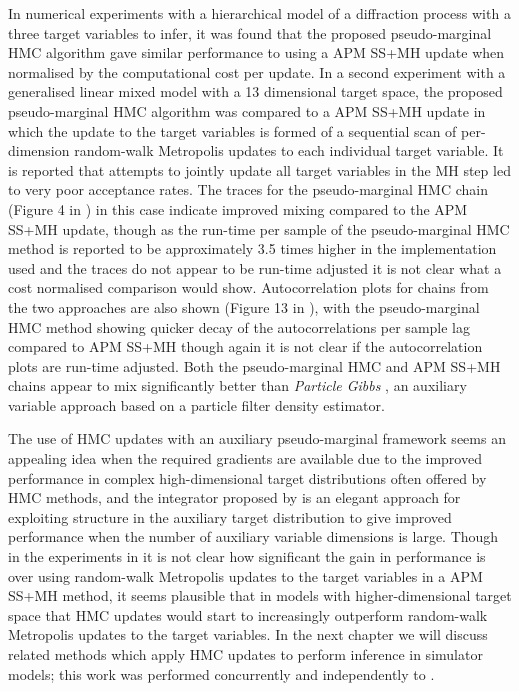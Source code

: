 In numerical experiments with a hierarchical model of a diffraction process with a three target variables to infer, it was found that the proposed pseudo-marginal \ac{HMC} algorithm gave similar performance to using a \ac{APM} \ac{SS}+\ac{MH} update when normalised by the computational cost per update. In a second experiment with a generalised linear mixed model with a 13 dimensional target space, the proposed pseudo-marginal \ac{HMC} algorithm was compared to a \ac{APM} \ac{SS}+\ac{MH} update in which the update to the target variables is formed of a sequential scan of per-dimension random-walk Metropolis updates to each individual target variable. It is reported that attempts to jointly update all target variables in the \ac{MH} step led to very poor acceptance rates. The traces for the pseudo-marginal \ac{HMC} chain (Figure 4 in \citep{lindsten2016pseudo}) in this case indicate improved mixing compared to the \ac{APM} \ac{SS}+\ac{MH} update, though as the run-time per sample of the pseudo-marginal \ac{HMC} method is reported to be approximately 3.5 times higher in the implementation used and the traces do not appear to be run-time adjusted it is not clear what a cost normalised comparison would show. Autocorrelation plots for chains from the two approaches are also shown (Figure 13 in \citep{lindsten2016pseudo}), with the pseudo-marginal \ac{HMC} method showing quicker decay of the autocorrelations per sample lag compared to \ac{APM} \ac{SS}+\ac{MH} though again it is not clear if the autocorrelation plots are run-time adjusted. Both the pseudo-marginal \ac{HMC} and \ac{APM} \ac{SS}+\ac{MH} chains appear to mix significantly better than \emph{Particle Gibbs} \citep{andrieu2009pseudo}, an auxiliary variable approach based on a particle filter density estimator. %

The use of \ac{HMC} updates with an auxiliary pseudo-marginal framework seems an appealing idea when the required gradients are available due to the improved performance in complex high-dimensional target distributions often offered by \ac{HMC} methods, and the integrator proposed by \citep{lindsten2016pseudo} is an elegant approach for exploiting structure in the auxiliary target distribution to give improved performance when the number of auxiliary variable dimensions is large. Though in the experiments in \citep{lindsten2016pseudo} it is not clear how significant the gain in performance is over using random-walk Metropolis updates to the target variables in a \ac{APM} \ac{SS}+\ac{MH} method, it seems plausible that in models with higher-dimensional target space that \ac{HMC} updates would start to increasingly outperform random-walk Metropolis updates to the target variables. In the next chapter we will discuss related methods which apply \ac{HMC} updates to perform inference in simulator models; this work was performed concurrently and independently to \citep{lindsten2016pseudo}. 





